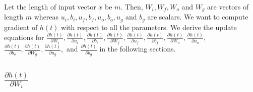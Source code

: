 \documentclass[twoside,11pt]{article}
\begin{document}
Let the length of input vector $x$ be $m$. Then, $W_{i}, W_{f}, W_{o}$ and $W_{g}$ are vectors of length $m$ whereas $u_i, b_i, u_f, b_f, u_o, b_o, u_g$ and $b_g$ are scalars. We want to compute gradient of $h(t)$ with respect to all the parameters. We derive the update equations for $\frac{\partial h(t)}{\partial W_{i}} ,\frac{\partial h(t)}{\partial u_{i}}, $$\frac{\partial h(t)}{\partial b_{i}}, \frac{\partial h(t)}{\partial W_{f}} $$,\frac{\partial h(t)}{\partial u_{f}}, \frac{\partial h(t)}{\partial b_{f}}, $$\frac{\partial h(t)}{\partial W_{o}} ,\frac{\partial h(t)}{\partial u_{o}},$$ \frac{\partial h(t)}{\partial b_{o}}, \frac{\partial h(t)}{\partial W_{g}} ,\frac{\partial h(t)}{\partial u_{g}},$ and $\frac{\partial h(t)}{\partial b_{g}}$ in the following sections. 

\subsection{$\frac{\partial h(t)}{\partial W_{i}}$}
\end{document}

